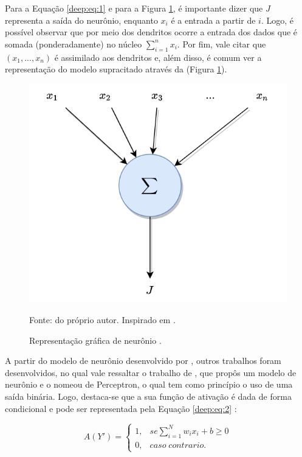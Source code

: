 Para a Equação \ref{deep:eq:1} e para a Figura \ref{deep:fig:2}, é importante dizer que $J$ representa a saída do neurônio, enquanto $x_i$ é a entrada a partir de $i$. Logo, é possível observar que por meio dos dendritos ocorre a entrada dos dados que é somada (ponderadamente) no núcleo $\sum_{i = 1}^{n} x_i$. Por fim, vale citar que $(x_1, ..., x_n)$ é assimilado aos dendritos e, além disso, é comum ver a representação do modelo supracitado através da (Figura \ref{deep:fig:2}).

\begin{figure}[H]
    \centering
    \caption{Representação gráfica de neurônio \cite{mcculloch1943logical}.}
    \includegraphics[width=1\linewidth]{recursos/imagens/deep/neuronio_mc.png}
    \label{deep:fig:2}

    Fonte: do próprio autor. Inspirado em \cite{mcculloch1943logical}.
\end{figure}

A partir do modelo de neurônio desenvolvido por \cite{mcculloch1943logical},  outros trabalhos foram desenvolvidos, no qual vale ressaltar o trabalho de \cite{Rosenblatt1958}, que propôs um modelo de neurônio e o nomeou de Perceptron, o qual tem como princípio o uso de uma saída binária. Logo, destaca-se que a sua função de ativação é dada de forma condicional e pode ser representada pela Equação \ref{deep:eq:2} \citep{Rosenblatt1958}:

\begin{equation}
    \label{deep:eq:2}
    A(Y') = \left\{\begin{matrix}
     1,& se \sum_{i = 1}^{N} w_i x_i + b \geq 0 \\ 
     0,& caso \;  contrario.
    \end{matrix}\right.
\end{equation}

